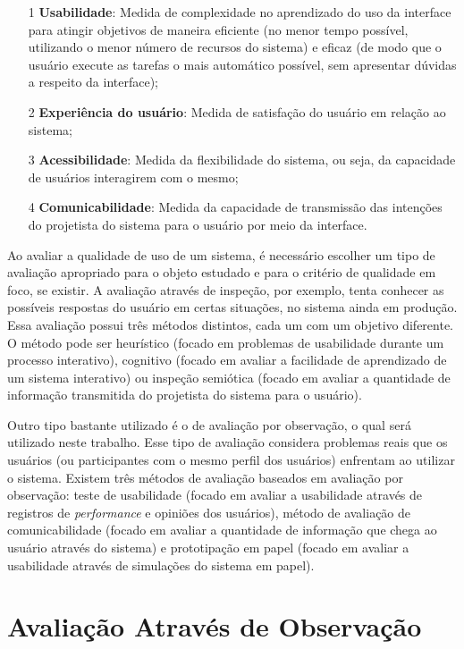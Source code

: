 \begin{itemize}
\item[1] \textbf{Usabilidade}: Medida de complexidade no aprendizado do uso da interface para atingir objetivos de maneira eficiente (no menor tempo possível, utilizando o menor número de recursos do sistema) e eficaz (de modo que o usuário execute as tarefas o mais automático possível, sem apresentar dúvidas a respeito da interface);
\item[2] \textbf{Experiência do usuário}: Medida de satisfação do usuário em relação ao sistema;
\item[3] \textbf{Acessibilidade}: Medida da flexibilidade do sistema, ou seja, da capacidade de usuários interagirem com o mesmo;
\item[4] \textbf{Comunicabilidade}: Medida da capacidade de transmissão das intenções do projetista do sistema para o usuário por meio da interface. %
\end{itemize}

\indent Ao avaliar a qualidade de uso de um sistema, é necessário escolher um tipo de avaliação apropriado para o objeto estudado e para o critério de qualidade em foco, se existir. A avaliação através de inspeção, por exemplo, tenta conhecer as possíveis respostas do usuário em certas situações, no sistema ainda em produção. Essa avaliação possui três métodos distintos, cada um com um objetivo diferente. O método pode ser heurístico (focado em problemas de usabilidade durante um processo interativo), cognitivo (focado em avaliar a facilidade de aprendizado de um sistema interativo) ou inspeção semiótica (focado em avaliar a quantidade de informação transmitida do projetista do sistema para o usuário).

\indent Outro tipo bastante utilizado é o de avaliação por observação, o qual será utilizado neste trabalho. Esse tipo de avaliação considera problemas reais que os usuários (ou participantes com o mesmo perfil dos usuários) enfrentam ao utilizar o sistema. Existem três métodos de avaliação baseados em avaliação por observação: teste de usabilidade (focado em avaliar a usabilidade através de registros de \textit{performance} e opiniões dos usuários), método de avaliação de comunicabilidade (focado em avaliar a quantidade de informação que chega ao usuário através do sistema) e prototipação em papel (focado em avaliar a usabilidade através de simulações do sistema em papel).  

\section{Avaliação Através de Observação} \label{avaObs}

